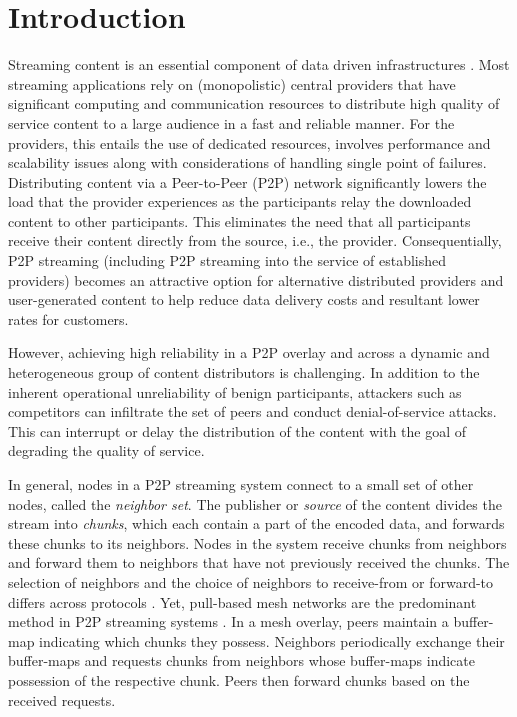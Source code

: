 \section{Introduction}
\label{sec:intro}

Streaming content is an essential component of data driven infrastructures \cite{emule}.
Most streaming applications rely on (monopolistic) central providers that have significant computing and communication resources to distribute high quality of service content to a large audience in a fast and reliable manner. For the providers, this entails the use of dedicated resources, involves performance and scalability issues along with considerations of handling single point of failures.
Distributing content via a Peer-to-Peer (P2P) network significantly lowers the load that the provider experiences as the participants relay the downloaded content to other participants. This eliminates the need that all participants receive their content directly from the source, i.e., the provider. 
Consequentially, P2P streaming (including P2P streaming into the service of established providers) becomes an attractive option for alternative distributed providers and user-generated content to help reduce data delivery costs and resultant lower rates for customers.


However, achieving high reliability in a P2P overlay and across a dynamic and heterogeneous group of content distributors is challenging. In addition to the inherent operational unreliability of benign participants, attackers such as competitors can infiltrate the set of peers and conduct denial-of-service attacks. This can interrupt or delay the distribution of the content with the goal of degrading the quality of service. 

In general, nodes in a P2P streaming system connect to a small set of other nodes, called the \emph{neighbor set}. 
The publisher or \emph{source} of the content divides the stream into \emph{chunks}, which each contain a part of the encoded data, and forwards these chunks to its neighbors. Nodes in the system receive chunks from neighbors and forward them to neighbors that have not previously received the chunks. 
The selection of neighbors and the choice of neighbors to receive-from or forward-to differs across protocols \cite{sasi2014survey}.  Yet, pull-based mesh networks are the predominant method in P2P streaming systems \cite{zhang2014modeling}. In a mesh overlay, peers maintain a buffer-map indicating which chunks they possess.  Neighbors periodically exchange their buffer-maps and requests chunks from neighbors whose buffer-maps indicate possession of the respective chunk. Peers then forward chunks based on the received requests. 



